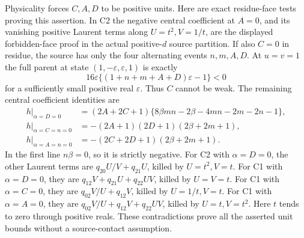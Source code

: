 Physicality forces \(C,A,D\) to be positive units. Here are exact
residue-face tests proving this assertion. In C2 the negative central
coefficient at \(A=0\), and its vanishing positive Laurent terms along
\(U=t^2,V=1/t\), are the displayed forbidden-face proof in the actual
positive-\(d\) source partition. If also \(C=0\) in residue, the source
has only the four alternating events \(n,m,A,D\). At \(u=v=1\) the full
parent at state \((1,-\varepsilon,\varepsilon,1)\) is exactly
\[
 16\varepsilon\{(1+n+m+A+D)\varepsilon-1\}<0
 \tag{WA1}
\]
for a sufficiently small positive real \(\varepsilon\).
Thus \(C\) cannot be weak. The remaining central coefficient identities
are
\[
\begin{aligned}
h|_{\alpha=D=0}
 &=(2A+2C+1)\{8\beta mn-2\beta-4mn-2m-2n-1\},\\
h|_{\alpha=C=n=0}
 &=-(2A+1)(2D+1)(2\beta+2m+1),\\
h|_{\alpha=A=n=0}
 &=-(2C+2D+1)(2\beta+2m+1).
\end{aligned}\tag{WA2}
\]
In the first line \(n\beta=0\), so it is strictly negative. For C2
with \(\alpha=D=0\), the other Laurent terms are
\(q_{20}U/V+q_{21}U\), killed by \(U=t^2,V=t\).
For C1 with \(\alpha=D=0\), they are
\(q_{12}V+q_{21}U+q_{22}UV\), killed by \(U=V=t\).
For C1 with \(\alpha=C=0\), they are \(q_{02}V/U+q_{12}V\),
killed by \(U=1/t,V=t\). For C1 with \(\alpha=A=0\), they are
\(q_{02}V/U+q_{12}V+q_{22}UV\), killed by \(U=t,V=t^2\).
Here \(t\) tends to zero through positive reals. These contradictions
prove all the asserted unit bounds without a source-contact assumption.


